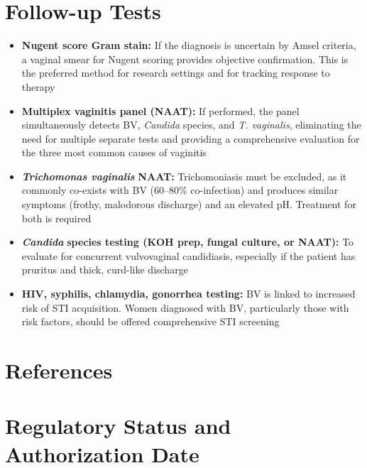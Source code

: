 \section*{Follow-up Tests}
\begin{itemize}
  \item \textbf{Nugent score Gram stain:} If the diagnosis is uncertain by Amsel criteria, a vaginal smear for Nugent scoring provides objective confirmation. This is the preferred method for research settings and for tracking response to therapy
  \item \textbf{Multiplex vaginitis panel (NAAT):} If performed, the panel simultaneously detects BV, \textit{Candida} species, and \textit{T. vaginalis}, eliminating the need for multiple separate tests and providing a comprehensive evaluation for the three most common causes of vaginitis
  \item \textit{\textbf{Trichomonas vaginalis}} \textbf{NAAT:} Trichomoniasis must be excluded, as it commonly co-exists with BV (60--80\% co-infection) and produces similar symptoms (frothy, malodorous discharge) and an elevated pH. Treatment for both is required
  \item \textit{\textbf{Candida}} \textbf{species testing (KOH prep, fungal culture, or NAAT):} To evaluate for concurrent vulvovaginal candidiasis, especially if the patient has pruritus and thick, curd-like discharge
  \item \textbf{HIV, syphilis, chlamydia, gonorrhea testing:} BV is linked to increased risk of STI acquisition. Women diagnosed with BV, particularly those with risk factors, should be offered comprehensive STI screening
\end{itemize}

\section*{References}



\clearpage
\section*{Regulatory Status and Authorization Date}

\clearpage
